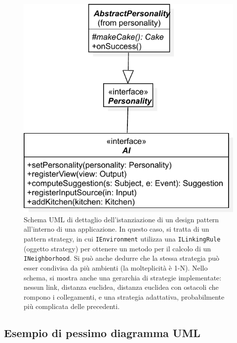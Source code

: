 \documentclass[a4paper,12pt]{report}
\begin{document}
\begin{figure}
\centering{}
\includegraphics[width=\textwidth]{img/strategy}
\caption{Schema UML di dettaglio dell'istanziazione di un design pattern all'interno di una applicazione.
%
In questo caso, si tratta di un pattern strategy, in cui \texttt{IEnvironment} utilizza una \texttt{ILinkingRule} (oggetto strategy) per ottenere un metodo per il calcolo di un \texttt{INeighborhood}.
%
Si può anche dedurre che la stessa strategia può esser condivisa da più ambienti (la molteplicità è 1-N).
%
Nello schema, si mostra anche una gerarchia di strategie implementate: nessun link, distanza euclidea, distanza euclidea con ostacoli che rompono i collegamenti, e una strategia adattativa, probabilmente più complicata delle precedenti.
}
\label{img:strategy}
\end{figure}

\subsection*{Esempio di pessimo diagramma UML}
\end{document}
